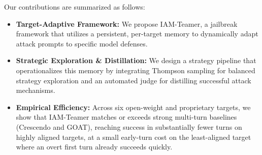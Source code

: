 Our contributions are summarized as follows:
\begin{itemize}
      \item \textbf{Target-Adaptive Framework:} We propose IAM-Teamer, a jailbreak framework that utilizes a persistent, per-target memory to dynamically adapt attack prompts to specific model defenses.
      \item \textbf{Strategic Exploration \& Distillation:} We design a strategy pipeline that operationalizes this memory by integrating Thompson sampling for balanced strategy exploration and an automated judge for distilling successful attack mechanisms.
      \item \textbf{Empirical Efficiency:} Across six open-weight and proprietary targets, we show that IAM-Teamer matches or exceeds strong multi-turn baselines (Crescendo and GOAT), reaching success in substantially fewer turns on highly aligned targets, at a small early-turn cost on the least-aligned target where an overt first turn already succeeds quickly.
\end{itemize}

